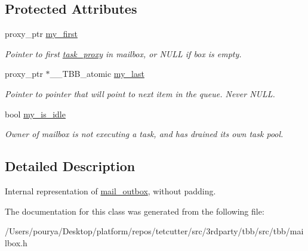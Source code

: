 \subsection*{Protected Attributes}
\begin{DoxyCompactItemize}
\item 
\hypertarget{classtbb_1_1internal_1_1unpadded__mail__outbox_a3ee26b23db3bff135fad3aa2aaa07c59}{}proxy\+\_\+ptr \hyperlink{classtbb_1_1internal_1_1unpadded__mail__outbox_a3ee26b23db3bff135fad3aa2aaa07c59}{my\+\_\+first}\label{classtbb_1_1internal_1_1unpadded__mail__outbox_a3ee26b23db3bff135fad3aa2aaa07c59}

\begin{DoxyCompactList}\small\item\em Pointer to first \hyperlink{structtbb_1_1internal_1_1task__proxy}{task\+\_\+proxy} in mailbox, or N\+U\+L\+L if box is empty. \end{DoxyCompactList}\item 
\hypertarget{classtbb_1_1internal_1_1unpadded__mail__outbox_a812639a0cd3bff371afd51922d80ed7b}{}proxy\+\_\+ptr $\ast$\+\_\+\+\_\+\+T\+B\+B\+\_\+atomic \hyperlink{classtbb_1_1internal_1_1unpadded__mail__outbox_a812639a0cd3bff371afd51922d80ed7b}{my\+\_\+last}\label{classtbb_1_1internal_1_1unpadded__mail__outbox_a812639a0cd3bff371afd51922d80ed7b}

\begin{DoxyCompactList}\small\item\em Pointer to pointer that will point to next item in the queue. Never N\+U\+L\+L. \end{DoxyCompactList}\item 
\hypertarget{classtbb_1_1internal_1_1unpadded__mail__outbox_ae34c49eefcf28e324fc0467202186686}{}bool \hyperlink{classtbb_1_1internal_1_1unpadded__mail__outbox_ae34c49eefcf28e324fc0467202186686}{my\+\_\+is\+\_\+idle}\label{classtbb_1_1internal_1_1unpadded__mail__outbox_ae34c49eefcf28e324fc0467202186686}

\begin{DoxyCompactList}\small\item\em Owner of mailbox is not executing a task, and has drained its own task pool. \end{DoxyCompactList}\end{DoxyCompactItemize}


\subsection{Detailed Description}
Internal representation of \hyperlink{classtbb_1_1internal_1_1mail__outbox}{mail\+\_\+outbox}, without padding. 

The documentation for this class was generated from the following file\+:\begin{DoxyCompactItemize}
\item 
/\+Users/pourya/\+Desktop/platform/repos/tetcutter/src/3rdparty/tbb/src/tbb/mailbox.\+h\end{DoxyCompactItemize}
